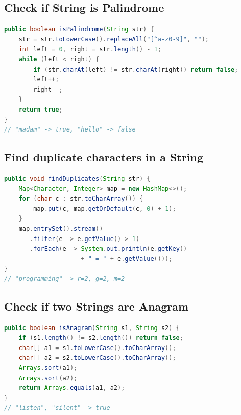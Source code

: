\documentclass[12pt,a4paper]{article}
\begin{document}
\subsection{Check if String is Palindrome}

\begin{answerbox}
\begin{lstlisting}[language=Java]
public boolean isPalindrome(String str) {
    str = str.toLowerCase().replaceAll("[^a-z0-9]", "");
    int left = 0, right = str.length() - 1;
    while (left < right) {
        if (str.charAt(left) != str.charAt(right)) return false;
        left++;
        right--;
    }
    return true;
}
// "madam" -> true, "hello" -> false
\end{lstlisting}
\end{answerbox}

\subsection{Find duplicate characters in a String}

\begin{answerbox}
\begin{lstlisting}[language=Java]
public void findDuplicates(String str) {
    Map<Character, Integer> map = new HashMap<>();
    for (char c : str.toCharArray()) {
        map.put(c, map.getOrDefault(c, 0) + 1);
    }
    map.entrySet().stream()
       .filter(e -> e.getValue() > 1)
       .forEach(e -> System.out.println(e.getKey() 
                     + " = " + e.getValue()));
}
// "programming" -> r=2, g=2, m=2
\end{lstlisting}
\end{answerbox}

\subsection{Check if two Strings are Anagram}

\begin{answerbox}
\begin{lstlisting}[language=Java]
public boolean isAnagram(String s1, String s2) {
    if (s1.length() != s2.length()) return false;
    char[] a1 = s1.toLowerCase().toCharArray();
    char[] a2 = s2.toLowerCase().toCharArray();
    Arrays.sort(a1);
    Arrays.sort(a2);
    return Arrays.equals(a1, a2);
}
// "listen", "silent" -> true
\end{lstlisting}
\end{answerbox}
\end{document}
